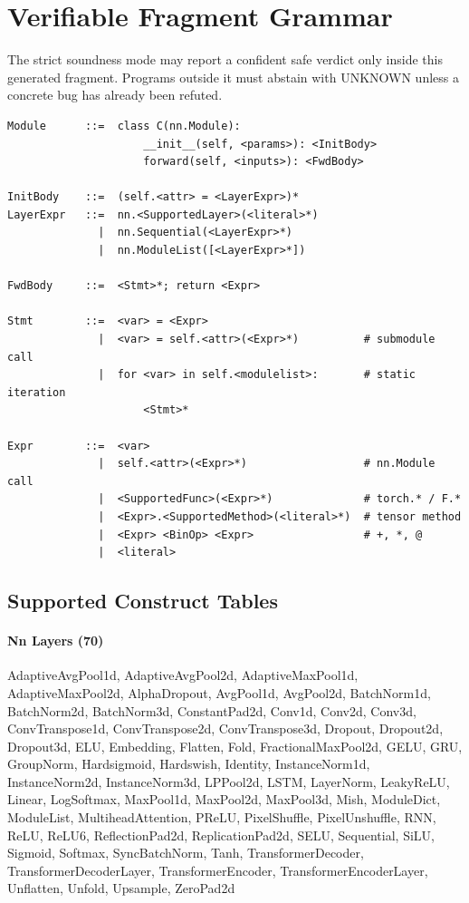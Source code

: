 \documentclass[10pt]{article}
\begin{document}
\section{Verifiable Fragment Grammar}
The strict soundness mode may report a confident safe verdict only inside this generated fragment. Programs outside it must abstain with UNKNOWN unless a concrete bug has already been refuted.
\begin{verbatim}
Module      ::=  class C(nn.Module):
                     __init__(self, <params>): <InitBody>
                     forward(self, <inputs>): <FwdBody>

InitBody    ::=  (self.<attr> = <LayerExpr>)*
LayerExpr   ::=  nn.<SupportedLayer>(<literal>*)
              |  nn.Sequential(<LayerExpr>*)
              |  nn.ModuleList([<LayerExpr>*])

FwdBody     ::=  <Stmt>*; return <Expr>

Stmt        ::=  <var> = <Expr>
              |  <var> = self.<attr>(<Expr>*)          # submodule call
              |  for <var> in self.<modulelist>:       # static iteration
                     <Stmt>*

Expr        ::=  <var>
              |  self.<attr>(<Expr>*)                  # nn.Module call
              |  <SupportedFunc>(<Expr>*)              # torch.* / F.*
              |  <Expr>.<SupportedMethod>(<literal>*)  # tensor method
              |  <Expr> <BinOp> <Expr>                 # +, *, @
              |  <literal>
\end{verbatim}

\subsection{Supported Construct Tables}
\paragraph{Nn Layers (70)}
{\footnotesize AdaptiveAvgPool1d, AdaptiveAvgPool2d, AdaptiveMaxPool1d, AdaptiveMaxPool2d, AlphaDropout, AvgPool1d, AvgPool2d, BatchNorm1d, BatchNorm2d, BatchNorm3d, ConstantPad2d, Conv1d, Conv2d, Conv3d, ConvTranspose1d, ConvTranspose2d, ConvTranspose3d, Dropout, Dropout2d, Dropout3d, ELU, Embedding, Flatten, Fold, FractionalMaxPool2d, GELU, GRU, GroupNorm, Hardsigmoid, Hardswish, Identity, InstanceNorm1d, InstanceNorm2d, InstanceNorm3d, LPPool2d, LSTM, LayerNorm, LeakyReLU, Linear, LogSoftmax, MaxPool1d, MaxPool2d, MaxPool3d, Mish, ModuleDict, ModuleList, MultiheadAttention, PReLU, PixelShuffle, PixelUnshuffle, RNN, ReLU, ReLU6, ReflectionPad2d, ReplicationPad2d, SELU, Sequential, SiLU, Sigmoid, Softmax, SyncBatchNorm, Tanh, TransformerDecoder, TransformerDecoderLayer, TransformerEncoder, TransformerEncoderLayer, Unflatten, Unfold, Upsample, ZeroPad2d}
\end{document}
